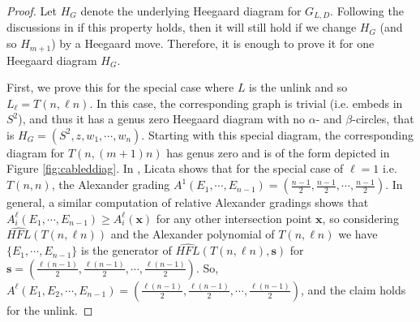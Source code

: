 \documentclass{amsart}
\newcommand{\HFL}{\mathit{HFL}}
\newcommand{\x}{\mathbf{x}}
\def\x{\mathbf{x}}
\renewcommand{\ss}{\mathbf{s}}
\begin{document}
\begin{proof}

 Let $H_G$ denote the underlying Heegaard diagram for $G_{L,D}$. Following the discussions in \cite[Section 5.4]{Zemke2} if 
 this property holds, then it will still hold if we change $H_G$ (and so $H_{m+1}$) by a Heegaard move. Therefore, it is enough to prove it for one Heegaard diagram $H_G$. 

First, we prove this for the special case where $L$ is the unlink and so $L_{\ell}=T(n,\ell n)$. In this case, the corresponding graph is trivial (i.e. embeds in $S^2$), and thus it has a genus zero Heegaard diagram with no $\alpha$- and $\beta$-circles, that is $H_G=(S^2,z,w_1,\cdots,w_n)$. Starting with this special diagram, the corresponding diagram for $T(n,(m+1)n)$ has genus zero and is of the form depicted in Figure \ref{fig:cableddiag}. In \cite{Licata}, Licata shows that for the special case of $\ell=1$ i.e. $T(n,n)$, the Alexander grading $A^1(E_1,\cdots,E_{n-1})=\left(\frac{n-1}{2},\frac{n-1}{2},\cdots,\frac{n-1}{2}\right)$. In general, a similar computation of relative Alexander gradings shows that $A^{\ell}_i(E_1,\cdots,E_{n-1})\ge A^{\ell}_i(\x)$ for any other intersection point $\x$, so considering $\widehat{\HFL}(T(n,\ell n))$ and the Alexander polynomial of $T(n,\ell n)$ we have $\{E_1,\cdots, E_{n-1}\}$ is the generator of $\widehat{\HFL}(T(n,\ell n),\ss)$ for $\ss=\left(\frac{\ell(n-1)}{2},\frac{\ell(n-1)}{2},\cdots,\frac{\ell(n-1)}{2}\right)$. So, $A^{\ell}(E_1,E_2,\cdots,E_{n-1})=\left(\frac{\ell(n-1)}{2},\frac{\ell(n-1)}{2},\cdots,\frac{\ell(n-1)}{2}\right)$, and the claim holds for the unlink.





\end{proof}
\end{document}
